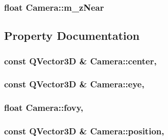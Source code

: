 \subsubsection[{m\+\_\+z\+Near}]{\setlength{\rightskip}{0pt plus 5cm}float Camera\+::m\+\_\+z\+Near\hspace{0.3cm}{\ttfamily [protected]}}\label{class_camera_ae77d866ea9d0aa75853c8243154fca82}


\subsection{Property Documentation}
\hypertarget{class_camera_aacb30cc51aef5e3f98db5b51e3a4ef3b}{}
\subsubsection[{center}]{\setlength{\rightskip}{0pt plus 5cm}const Q\+Vector3\+D \& Camera\+::center\hspace{0.3cm}{\ttfamily [read]}, {\ttfamily [write]}}\label{class_camera_aacb30cc51aef5e3f98db5b51e3a4ef3b}
\hypertarget{class_camera_aac5808300c4e00d266da238ad35b1a1b}{}
\subsubsection[{eye}]{\setlength{\rightskip}{0pt plus 5cm}const Q\+Vector3\+D \& Camera\+::eye\hspace{0.3cm}{\ttfamily [read]}, {\ttfamily [write]}}\label{class_camera_aac5808300c4e00d266da238ad35b1a1b}
\hypertarget{class_camera_a6cba4066109137fb0d23ee207205927c}{}
\subsubsection[{fovy}]{\setlength{\rightskip}{0pt plus 5cm}float Camera\+::fovy\hspace{0.3cm}{\ttfamily [read]}, {\ttfamily [write]}}\label{class_camera_a6cba4066109137fb0d23ee207205927c}
\hypertarget{class_camera_a1e8c173f6a47c5ebea0e91aefea50b51}{}
\subsubsection[{position}]{\setlength{\rightskip}{0pt plus 5cm}const Q\+Vector3\+D \& Camera\+::position\hspace{0.3cm}{\ttfamily [read]}, {\ttfamily [write]}}\label{class_camera_a1e8c173f6a47c5ebea0e91aefea50b51}
\hypertarget{class_camera_a86995a93a125a9d9941f10144c4c398e}{}
